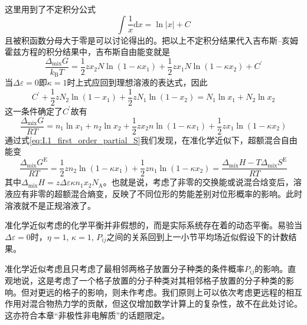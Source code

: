 \documentclass[main.tex]{subfiles}
\begin{document}
这里用到了不定积分公式
\[\int\frac{1}{x}\mathrm{d}x=\ln\left|x\right|+C\]
且被积函数分母大于零是可以讨论得出的。把以上不定积分结果代入吉布斯--亥姆霍兹方程的积分结果中，吉布斯自由能变就是
\[\frac{\Delta_\text{mix}G}{k_\text{B}T}=\frac{1}{2}zx_2N\ln\left(1-\kappa x_1\right)+\frac{1}{2}zx_1N\ln\left(1-\kappa x_2\right)+C^\prime\]
当$\Delta\varepsilon=0$即$\kappa=1$时上式应回到理想溶液的表达式，因此
\[C^\prime+\frac{1}{2}zN_2\ln\left(1-x_1\right)+\frac{1}{2}zN_1\ln\left(1-x_2\right)=N_1\ln x_1+N_2\ln x_2\]
这一条件确定了$C^\prime$故有
\begin{equation}
  \frac{\Delta_\text{mix}G}{RT}=n_1\ln x_1+n_2\ln x_2+\frac{1}{2}zx_2n\ln\left(1-\kappa x_1\right)+\frac{1}{2}zx_1\ln\left(1-\kappa x_2\right)
\end{equation}
通过式\eqref{eq:I.1_first_order_partial_S}我们发现，在准化学近似下，超额混合自由能变
\[\frac{\Delta_\text{mix}G^\text{E}}{RT}=\frac{1}{2}zn_2\ln\left(1-\kappa x_1\right)+\frac{1}{2}zn_1\ln\left(1-\kappa x_2\right)=\frac{\Delta_\text{mix}H-T\Delta_\text{mix}S^\text{E}}{RT}\]
其中$\Delta_\text{mix}H=z\Delta\varepsilon\kappa n_1 x_2 N_\text{A}$。也就是说，考虑了非零的交换能或说混合焓变后，溶液应有非零的超额混合熵变，反映了不同位形的势能差别对位形概率的影响。此时溶液就不是正规溶液了。

准化学近似考虑的化学平衡并非假想的，而是实际系统存在着的动态平衡。易验当$\Delta\varepsilon=0$时，$\eta=1$, $\kappa=1$, $P_{ij}$之间的关系回到上一小节平均场近似假设下的计数结果。

准化学近似考虑且只考虑了最相邻两格子放置分子种类的条件概率$P_{ij}$的影响。直观地说，这是考虑了一个格子放置的分子种类对其相邻格子放置的分子种类的影响。但对更远的格子的影响，则未作考虑。我们原则上可以依次考虑更远程的相互作用对混合物热力学的贡献，但这仅增加数学计算上的复杂性，故不在此处讨论。这亦符合本章“非极性非电解质”的话题限定。
\end{document}
